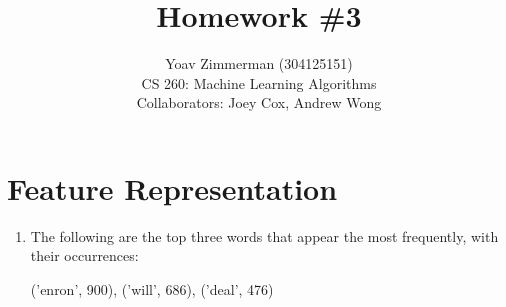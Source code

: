 \documentclass[12pt]{article}
\begin{document}
\title{Homework \#3}
\author{Yoav Zimmerman (304125151) \\
	    CS 260: Machine Learning Algorithms \\
	   Collaborators: Joey Cox, Andrew Wong}
\maketitle

\section{Feature Representation}
\begin{enumerate}[label=\alph*.]
    \item The following are the top three words that appear the most frequently, with their occurrences: \\
    \begin{center}
	{('enron', 900), ('will', 686), ('deal', 476)}
    \end{center} 
\end{enumerate}
\end{document}
